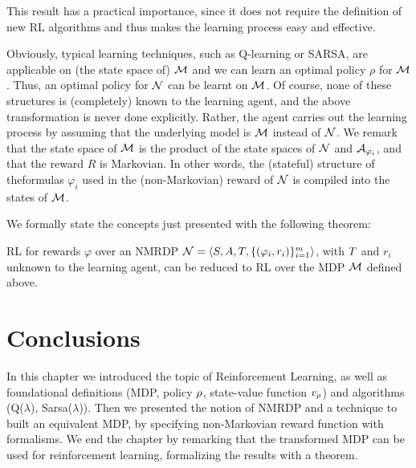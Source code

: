 This result has a practical importance, since it does not require the
definition of new RL algorithms and thus makes the learning
process easy and effective.

Obviously, typical learning techniques, such as Q-learning or SARSA, are applicable on (the state space of) $\mathcal{M}$ and we can learn an optimal policy $\rho$ for $\mathcal{M}$. Thus, an optimal policy for $\mathcal{N}$ can be learnt on $\mathcal{M}$. Of course, none of these structures is (completely) known to the learning agent, and the above transformation is never done explicitly. Rather, the agent carries out the learning process by assuming that the underlying model is $\mathcal{M}$ instead of $\mathcal{N}$. We remark that the state space of $\mathcal{M}$ is the product of the state spaces of $\mathcal{N}$ and $\mathcal{A}_{\varphi_i}$, and that the reward $R$ is Markovian. In other words, the (stateful) structure of the\LLf formulas $\varphi_i$ used in the (non-Markovian) reward of $\mathcal{N}$ is compiled into the states of $\mathcal{M}$.

We formally state the concepts just presented with the following theorem:

\begin{theorem}\label{th:rl-for-llf-rewards}
RL for \LLf rewards $\varphi$ over an NMRDP
$\mathcal{N} = \langle S, A, T, \{(\varphi_i, r_i)\}^m_{i=1} \rangle$, with $T$ and $r_i$ unknown to
the learning agent, can be reduced to RL over the MDP $\mathcal{M}$
defined above.
\end{theorem}

\section{Conclusions}
In this chapter we introduced the topic of Reinforcement Learning, as well as foundational definitions (MDP, policy $\rho$, state-value function $v_\rho$) and algorithms (Q($\lambda$), Sarsa($\lambda$)). Then we presented the notion of NMRDP and a technique to built an equivalent MDP, by specifying non-Markovian reward function with \LLf formalisms. We end the chapter by remarking that the transformed MDP can be used for reinforcement learning, formalizing the results with a theorem.
\endinput


